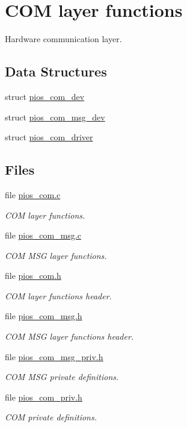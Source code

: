\hypertarget{group___p_i_o_s___c_o_m}{\section{\-C\-O\-M layer functions}
\label{group___p_i_o_s___c_o_m}
}


\-Hardware communication layer.  


\subsection*{\-Data \-Structures}
\begin{DoxyCompactItemize}
\item 
struct \hyperlink{structpios__com__dev}{pios\-\_\-com\-\_\-dev}
\item 
struct \hyperlink{structpios__com__msg__dev}{pios\-\_\-com\-\_\-msg\-\_\-dev}
\item 
struct \hyperlink{structpios__com__driver}{pios\-\_\-com\-\_\-driver}
\end{DoxyCompactItemize}
\subsection*{\-Files}
\begin{DoxyCompactItemize}
\item 
file \hyperlink{pios__com_8c}{pios\-\_\-com.\-c}
\begin{DoxyCompactList}\small\item\em \-C\-O\-M layer functions. \end{DoxyCompactList}\item 
file \hyperlink{pios__com__msg_8c}{pios\-\_\-com\-\_\-msg.\-c}
\begin{DoxyCompactList}\small\item\em \-C\-O\-M \-M\-S\-G layer functions. \end{DoxyCompactList}\item 
file \hyperlink{pios__com_8h}{pios\-\_\-com.\-h}
\begin{DoxyCompactList}\small\item\em \-C\-O\-M layer functions header. \end{DoxyCompactList}\item 
file \hyperlink{pios__com__msg_8h}{pios\-\_\-com\-\_\-msg.\-h}
\begin{DoxyCompactList}\small\item\em \-C\-O\-M \-M\-S\-G layer functions header. \end{DoxyCompactList}\item 
file \hyperlink{pios__com__msg__priv_8h}{pios\-\_\-com\-\_\-msg\-\_\-priv.\-h}
\begin{DoxyCompactList}\small\item\em \-C\-O\-M \-M\-S\-G private definitions. \end{DoxyCompactList}\item 
file \hyperlink{pios__com__priv_8h}{pios\-\_\-com\-\_\-priv.\-h}
\begin{DoxyCompactList}\small\item\em \-C\-O\-M private definitions. \end{DoxyCompactList}\end{DoxyCompactItemize}
